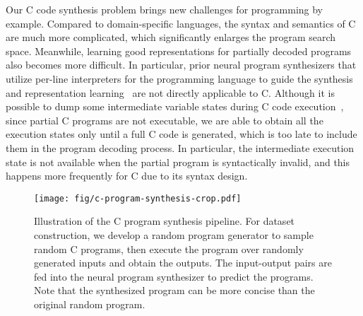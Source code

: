 Our C code synthesis problem brings new challenges for programming by example. Compared to domain-specific languages, the syntax and semantics of C are much more complicated, which significantly enlarges the program search space. Meanwhile, learning good representations for partially decoded programs also becomes more difficult. In particular, prior neural program synthesizers that utilize per-line interpreters for the programming language to guide the synthesis and representation learning~\cite{chen2018execution,shin2018improving,nye2020representing,Ellis2019WriteEAExtendExecution,odena2020bustle} are not directly applicable to C. Although it is possible to dump some intermediate variable states during C code execution~\cite{campbell2012executable}, since partial C programs are not executable, we are able to obtain all the execution states only until a full C code is generated, which is too late to include them in the program decoding process. In particular, the intermediate execution state is not available when the partial program is syntactically invalid, and this happens more frequently for C due to its syntax design.
\begin{figure}
    \centering
    \texttt{[image: fig/c-program-synthesis-crop.pdf]}
\caption{\small Illustration of the C program synthesis pipeline. For dataset construction, we develop a random program generator to sample random C programs, then execute the program over randomly generated inputs and obtain the outputs. The input-output pairs are fed into the neural program synthesizer to predict the programs. Note that the synthesized program can be more concise than the original random program.}
\label{fig:ex-c}
\end{figure}

